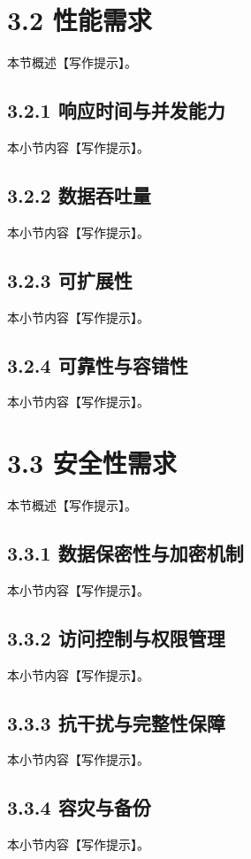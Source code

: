 \section{3.2 性能需求}
本节概述【写作提示】。\cite{Kee_2008}
\subsection{3.2.1 响应时间与并发能力}
本小节内容【写作提示】。\cite{baek2016_adhoc,baek2019_jsyst_timemirror,lee2018_jsyst,Spyridis_2010}
\subsection{3.2.2 数据吞吐量}
本小节内容【写作提示】。\cite{Kopp_Throughput_Enhanced_JTIDS_2006,Juarez_2025}
\subsection{3.2.3 可扩展性}
本小节内容【写作提示】。\cite{Viasat_STT_press_2020}
\subsection{3.2.4 可靠性与容错性}
本小节内容【写作提示】。\cite{Koromilas_2009,EverythingRF_STT}
\section{3.3 安全性需求}
本节概述【写作提示】。\cite{Collins_TTNT_immersion_2020}
\subsection{3.3.1 数据保密性与加密机制}
本小节内容【写作提示】。\cite{Euromids_2025_contract}
\subsection{3.3.2 访问控制与权限管理}
本小节内容【写作提示】。\cite{GovConWire_Euromids_2025}
\subsection{3.3.3 抗干扰与完整性保障}
本小节内容【写作提示】。\cite{musumeci_2014_ietrsn_pulseblank,borio_2013_ietspr_pulseblanking,houdzoumis2009_jn,wu_2016_taes_dme_wp,huo_2015_ieeecl_meb,huo_2015_comex_mixed_interference,mitch_2016_nav_chirp_geolocation,vandermerwe_2023_nav_mpanf,JCS_Directives_Library}
\subsection{3.3.4 容灾与备份}
本小节内容【写作提示】。\cite{CJCS_Manuals_Library}
